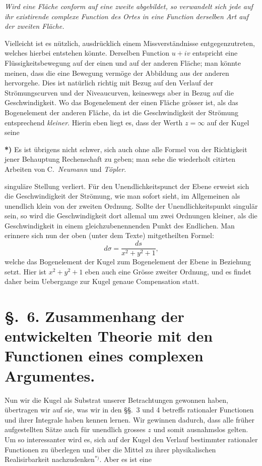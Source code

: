 \documentclass{article}
\begin{document}
\emph{Wird eine Fläche conform auf eine zweite abgebildet, so verwandelt sich jede auf ihr existirende complexe Function des Ortes in eine Function derselben Art auf der zweiten Fläche.}

Vielleicht ist es nützlich, ausdrücklich einem Missverständnisse entgegenzutreten, welches hierbei entstehen könnte. Derselben Function $u + iv$ entspricht eine Flüssigkeitsbewegung auf der einen und auf der anderen Fläche; man könnte meinen, dass die eine Bewegung vermöge der Abbildung aus der anderen hervorgehe. Dies ist natürlich richtig mit Bezug auf den Verlauf der Strömungscurven und der Niveaucurven, keineswegs aber in Bezug auf die Geschwindigkeit. Wo das Bogenelement der einen Fläche grösser ist, als das Bogenelement der anderen Fläche, da ist die Geschwindigkeit der Strömung entsprechend \emph{kleiner}. Hierin eben liegt es, dass der Werth $z = \infty$ auf der Kugel seine

\textbf{*)} Es ist übrigens nicht schwer, sich auch ohne alle Formel von der Richtigkeit jener Behauptung Rechenschaft zu geben; man sehe die wiederholt citirten Arbeiten von C.\ \emph{Neumann} und \emph{Töpler}.

singuläre Stellung verliert. Für den Unendlichkeitspunct der Ebene erweist sich die Geschwindigkeit der Strömung, wie man sofort sieht, im Allgemeinen als unendlich klein von der zweiten Ordnung. Sollte der Unendlichkeitspunkt singulär sein, so wird die Geschwindigkeit dort allemal um zwei Ordnungen kleiner, als die Geschwindigkeit in einem gleichzubenennenden Punkt des Endlichen. Man erinnere sich nun der oben (unter dem Texte) mitgetheilten Formel:
\[ d\sigma = \frac{ds}{x^{2} + y^{2} + 1}, \]
welche das Bogenelement der Kugel zum Bogenelement der Ebene in Beziehung setzt. Hier ist $x^{2} + y^{2} + 1$ eben auch eine Grösse zweiter Ordnung, und es findet daher beim Uebergange zur Kugel genaue Compensation statt.

\section*{§.~6. Zusammenhang der entwickelten Theorie mit den Functionen eines complexen Argumentes.}

Nun wir die Kugel als Substrat unserer Betrachtungen gewonnen haben, übertragen wir auf sie, was wir in den §§.~3 und 4 betreffs rationaler Functionen und ihrer Integrale haben kennen lernen. Wir gewinnen dadurch, dass alle früher aufgestellten Sätze auch für unendlich grosses $z$ und somit ausnahmslos gelten. Um so interessanter wird es, sich auf der Kugel den Verlauf bestimmter rationaler Functionen zu überlegen und über die Mittel zu ihrer physikalischen Realisirbarkeit nachzudenken${}^{*)}$. Aber es ist eine
\end{document}
